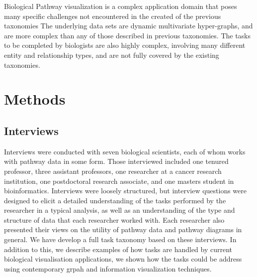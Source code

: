 
Biological Pathway visualization is a complex application domain that poses many specific challenges not encountered in the created of the previous taxonomies
The underlying data sets are dynamic multivariate hyper-graphs, and are more complex than any of those described in previous taxonomies.
The tasks to be completed by biologists are also highly complex, involving many different entity and relationship types, and are not fully covered by the existing taxonomies.







\section*{Methods}
\subsection*{Interviews}
Interviews were conducted with seven biological scientists, each of whom works with pathway data in some form.
Those interviewed included one tenured professor, three assistant professors, one researcher at a cancer research institution, one postdoctoral research associate, and one masters student in bioinformatics.
Interviews were loosely structured, but interview questions were designed to elicit a detailed understanding of the tasks performed by the researcher in a typical analysis, as well as an understanding of the type and structure of data that each researcher worked with.
Each researcher also presented their views on the utility of pathway data and pathway diagrams in general.
We have develop a full task taxonomy based on these interviews.
In addition to this, we describe examples of how tasks are handled by current biological visualisation applications, we shown how the tasks could be address using contemporary grpah and information visualization techniques.





